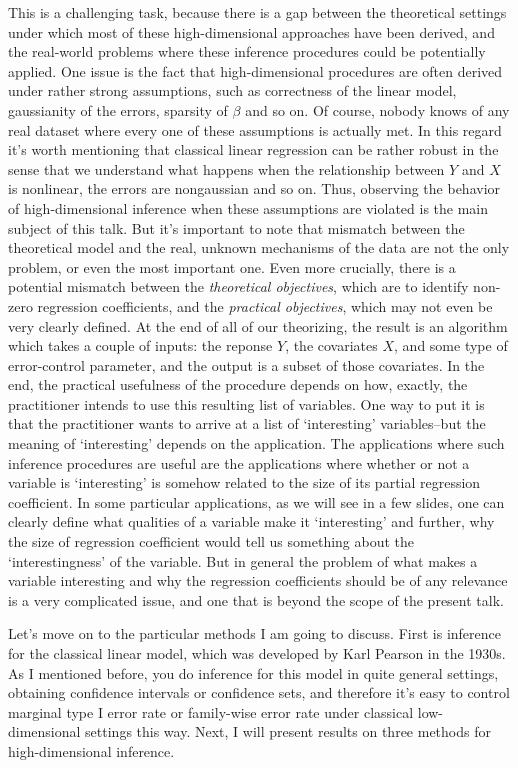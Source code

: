 \documentclass[11pt]{article}
\begin{document}
This is a challenging task, because there is a gap between the
theoretical settings under which most of these high-dimensional
approaches have been derived, and the real-world problems where these
inference procedures could be potentially applied.  One issue is the
fact that high-dimensional procedures are often derived under rather
strong assumptions, such as correctness of the linear model,
gaussianity of the errors, sparsity of $\beta$ and so on.  Of course,
nobody knows of any real dataset where every one of these assumptions
is actually met.  In this regard it's worth mentioning that classical
linear regression can be rather robust in the sense that we understand
what happens when the relationship between $Y$ and $X$ is nonlinear,
the errors are nongaussian and so on.  Thus, observing the behavior of
high-dimensional inference when these assumptions are violated is the
main subject of this talk.  But it's important to note that mismatch
between the theoretical model and the real, unknown mechanisms of the
data are not the only problem, or even the most important one.  Even
more crucially, there is a potential mismatch between the
\emph{theoretical objectives}, which are to identify non-zero
regression coefficients, and the \emph{practical objectives}, which
may not even be very clearly defined.  At the end of all of our
theorizing, the result is an algorithm which takes a couple of inputs:
the reponse $Y$, the covariates $X$, and some type of error-control
parameter, and the output is a subset of those covariates.  In the
end, the practical usefulness of the procedure depends on how,
exactly, the practitioner intends to use this resulting list of
variables.  One way to put it is that the practitioner wants to arrive
at a list of `interesting' variables--but the meaning of `interesting'
depends on the application.  The applications where such inference
procedures are useful are the applications where whether or not a
variable is `interesting' is somehow related to the size of its
partial regression coefficient.  In some particular applications, as
we will see in a few slides, one can clearly define what qualities of
a variable make it `interesting' and further, why the size of
regression coefficient would tell us something about the
`interestingness' of the variable.  But in general the problem of what
makes a variable interesting and why the regression coefficients
should be of any relevance is a very complicated issue, and one that
is beyond the scope of the present talk.

Let's move on to the particular methods I am going to discuss.  First
is inference for the classical linear model, which was developed by
Karl Pearson in the 1930s.  As I mentioned before, you do inference
for this model in quite general settings, obtaining confidence
intervals or confidence sets, and therefore it's easy to control
marginal type I error rate or family-wise error rate under classical
low-dimensional settings this way.  Next, I will present results on
three methods for high-dimensional inference.
\end{document}
